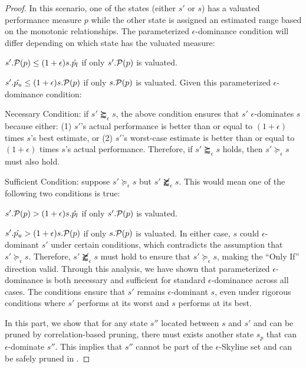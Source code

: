 {\begin{proof}
In this scenario, one of the states (either $s'$ or $s$) has a valuated performance measure $p$ 
while the other state is assigned an estimated range based on the monotonic relationships. 
The parameterized $\epsilon$-dominance condition will differ depending on which state has the valuated measure:
\bi
\item $s'.\P(p) \leq (1+\epsilon) s.\hat{p_l}$ if only $s'.\P(p)$ is valuated.
\item $s'.\hat{p_u} \leq (1+\epsilon) s.\P(p)$ if only $s.\P(p)$ is valuated.
\ei
Given this parameterized $\epsilon$-dominance condition:
\bi
\item Necessary Condition: 
if $s' \succapprox_{\epsilon} s$, the above condition ensures that $s'$ $\epsilon$-dominates $s$ because either: (1) $s'$'s actual performance is better than or equal to $(1+\epsilon)$ times $s$'s best estimate, or 
(2) $s'$'s worst-case estimate is better than or equal to $(1+\epsilon)$ times $s$'s actual performance.
Therefore, if $s' \succapprox_{\epsilon} s$ holds, then $s'\succeq_\epsilon s$ must also hold.
\item Sufficient Condition: 
suppose $s'\succeq_\epsilon s$ but $s' \not\succapprox_{\epsilon} s$. 
This would mean one of the following two conditions is true:
\bi
\item $s'.\P(p) > (1+\epsilon) s.\hat{p_l}$ if only $s'.\P(p)$ is valuated.
\item $s'.\hat{p_u} > (1+\epsilon) s.\P(p)$ if only $s.\P(p)$ is valuated.
\ei
In either case, $s$ could $\epsilon$-dominant $s'$ under certain conditions, which contradicts the assumption that $s'\succeq_\epsilon s$. 
Therefore, $s' \not\succapprox_{\epsilon} s$ must hold to ensure that $s'\succeq_\epsilon s$, making the ``Only If'' direction valid.
\ei
Through this analysis, we have shown that parameterized $\epsilon$-dominance is both necessary and sufficient for standard $\epsilon$-dominance across all cases. 
The conditions ensure that $s'$ remains $\epsilon$-dominant $s$, even 
under rigorous conditions where $s'$ performs at its worst and 
$s$ performs at its best.

In this part, we show that for any state $s''$ located between $s$ and $s'$ and can be pruned by correlation-based pruning, 
there must exists another state $s_p$ that can $\epsilon$-dominate $s''$.
This implies that $s''$ cannot be part of the $\epsilon$-Skyline set and can be safely pruned in \bimodis.


\end{proof}}

